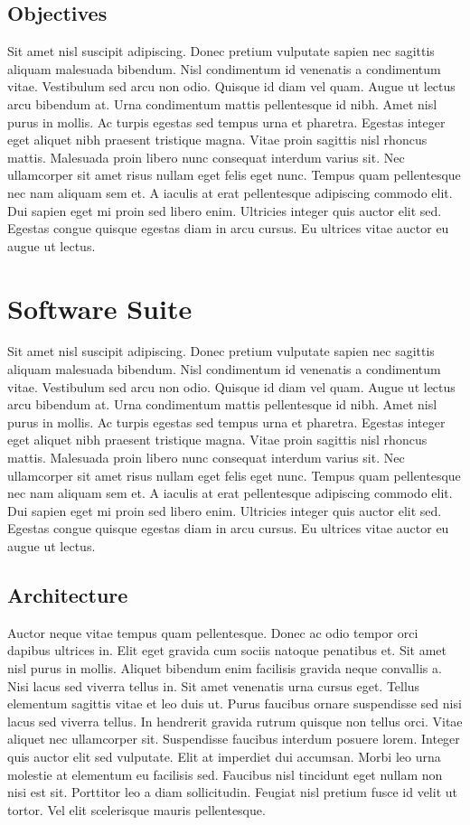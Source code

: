 \documentclass[a4paper,12pt]{article}
\begin{document}
\begin{multicols}{2}
\subsection{Objectives}
Sit amet nisl suscipit adipiscing. Donec pretium vulputate sapien nec sagittis aliquam malesuada bibendum. Nisl condimentum id venenatis a condimentum vitae. Vestibulum sed arcu non odio. Quisque id diam vel quam. Augue ut lectus arcu bibendum at. Urna condimentum mattis pellentesque id nibh. Amet nisl purus in mollis. Ac turpis egestas sed tempus urna et pharetra. Egestas integer eget aliquet nibh praesent tristique magna. Vitae proin sagittis nisl rhoncus mattis. Malesuada proin libero nunc consequat interdum varius sit. Nec ullamcorper sit amet risus nullam eget felis eget nunc. Tempus quam pellentesque nec nam aliquam sem et. A iaculis at erat pellentesque adipiscing commodo elit. Dui sapien eget mi proin sed libero enim. Ultricies integer quis auctor elit sed. Egestas congue quisque egestas diam in arcu cursus. Eu ultrices vitae auctor eu augue ut lectus.

\section{Software Suite}
Sit amet nisl suscipit adipiscing. Donec pretium vulputate sapien nec sagittis aliquam malesuada bibendum. Nisl condimentum id venenatis a condimentum vitae. Vestibulum sed arcu non odio. Quisque id diam vel quam. Augue ut lectus arcu bibendum at. Urna condimentum mattis pellentesque id nibh. Amet nisl purus in mollis. Ac turpis egestas sed tempus urna et pharetra. Egestas integer eget aliquet nibh praesent tristique magna. Vitae proin sagittis nisl rhoncus mattis. Malesuada proin libero nunc consequat interdum varius sit. Nec ullamcorper sit amet risus nullam eget felis eget nunc. Tempus quam pellentesque nec nam aliquam sem et. A iaculis at erat pellentesque adipiscing commodo elit. Dui sapien eget mi proin sed libero enim. Ultricies integer quis auctor elit sed. Egestas congue quisque egestas diam in arcu cursus. Eu ultrices vitae auctor eu augue ut lectus.


\subsection{Architecture}
Auctor neque vitae tempus quam pellentesque. Donec ac odio tempor orci dapibus ultrices in. Elit eget gravida cum sociis natoque penatibus et. Sit amet nisl purus in mollis. Aliquet bibendum enim facilisis gravida neque convallis a. Nisi lacus sed viverra tellus in. Sit amet venenatis urna cursus eget. Tellus elementum sagittis vitae et leo duis ut. Purus faucibus ornare suspendisse sed nisi lacus sed viverra tellus. In hendrerit gravida rutrum quisque non tellus orci. Vitae aliquet nec ullamcorper sit. Suspendisse faucibus interdum posuere lorem. Integer quis auctor elit sed vulputate. Elit at imperdiet dui accumsan. Morbi leo urna molestie at elementum eu facilisis sed. Faucibus nisl tincidunt eget nullam non nisi est sit. Porttitor leo a diam sollicitudin. Feugiat nisl pretium fusce id velit ut tortor. Vel elit scelerisque mauris pellentesque.


\end{multicols}
\end{document}
